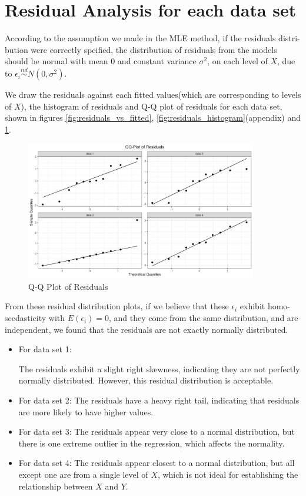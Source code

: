 \documentclass[12pt]{article}
\begin{document}
\section{Residual Analysis for each data set}
According to the assumption we made in the MLE method, if the residuals distri-bution were correctly spcified, 
the distribution of residuals from the models should be normal with mean 0 and constant variance \(\sigma^2\), on each
level of \(X\), due to \(\epsilon_i \overset{iid}{\sim} N(0, \sigma^2)\).

We draw the residuals against each fitted values(which are corresponding to levels of \(X\)), 
the histogram of residuals and Q-Q plot of residuals for each data set, shown in figures \ref{fig:residuals_vs_fitted}, 
\ref{fig:residuals_histogram}(appendix) and \ref{fig:residuals_qq}.

\begin{figure}
    \centering
    \includegraphics[width=0.9\textwidth]{../results/residuals_qq.png}
    \caption{Q-Q Plot of Residuals}
    \label{fig:residuals_qq}
\end{figure}

From these residual distribution plots, if we believe that these \(\epsilon_i\) 
exhibit homo-scedasticity with \(E(\epsilon_i) = 0\), and they
come from the same distribution, and are independent, we found that the residuals 
are not exactly normally distributed.

\begin{itemize}
  \item For data set 1:
  
       The residuals exhibit a slight right skewness, indicating they are not perfectly normally distributed. 
       However, this residual distribution is acceptable.
  \item For data set 2:
       The residuals have a heavy right tail, 
       indicating that residuals are more likely to have higher values.
  \item For data set 3:
       The residuals appear very close to a normal distribution, 
       but there is one extreme outlier in the regression, which affects the normality.
  \item For data set 4:
       The residuals appear closest to a normal distribution,
        but all except one are from a single level of \(X\), 
        which is not ideal for establishing the relationship between \(X\) and \(Y\). 
\end{itemize}
\end{document}
